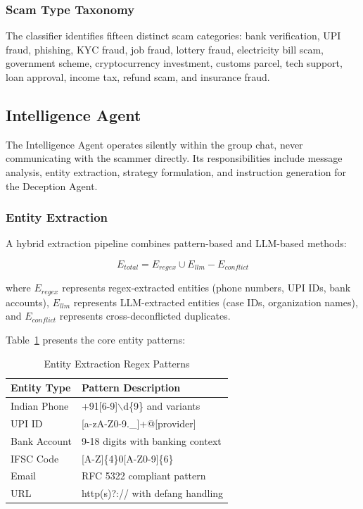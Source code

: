 \documentclass[conference]{IEEEtran}
\begin{document}
\subsubsection{Scam Type Taxonomy}
The classifier identifies fifteen distinct scam categories: bank verification, UPI fraud, phishing, KYC fraud, job fraud, lottery fraud, electricity bill scam, government scheme, cryptocurrency investment, customs parcel, tech support, loan approval, income tax, refund scam, and insurance fraud.

\subsection{Intelligence Agent}

The Intelligence Agent operates silently within the group chat, never communicating with the scammer directly. Its responsibilities include message analysis, entity extraction, strategy formulation, and instruction generation for the Deception Agent.

\subsubsection{Entity Extraction}

A hybrid extraction pipeline combines pattern-based and LLM-based methods:

\begin{equation}
E_{total} = E_{regex} \cup E_{llm} - E_{conflict}
\end{equation}

where $E_{regex}$ represents regex-extracted entities (phone numbers, UPI IDs, bank accounts), $E_{llm}$ represents LLM-extracted entities (case IDs, organization names), and $E_{conflict}$ represents cross-deconflicted duplicates.

Table~\ref{tab:regex} presents the core entity patterns:

\begin{table}[htbp]
\caption{Entity Extraction Regex Patterns}
\label{tab:regex}
\begin{center}
\begin{tabular}{|l|l|}
\hline
\textbf{Entity Type} & \textbf{Pattern Description} \\
\hline
Indian Phone & +91[6-9]$\backslash$d\{9\} and variants \\
\hline
UPI ID & [a-zA-Z0-9.\_]+@[provider] \\
\hline
Bank Account & 9-18 digits with banking context \\
\hline
IFSC Code & [A-Z]\{4\}0[A-Z0-9]\{6\} \\
\hline
Email & RFC 5322 compliant pattern \\
\hline
URL & http(s)?:// with defang handling \\
\hline
\end{tabular}
\end{center}
\end{table}
\end{document}
